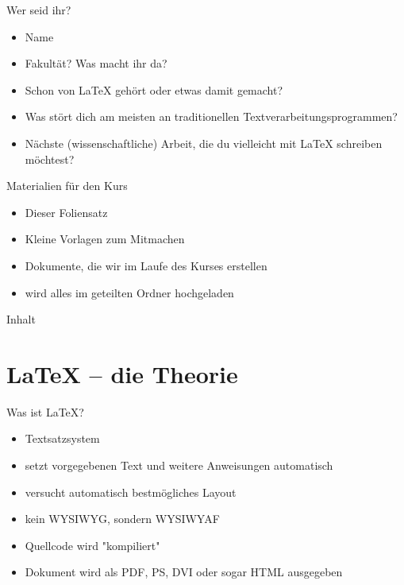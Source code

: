 \documentclass[presentation,aspectratio=169]{beamer}
\begin{document}

\begin{frame}{Wer seid ihr?}
  \begin{itemize}
    \item Name
    \item Fakultät? Was macht ihr da?
    \item Schon von \LaTeX{} gehört oder etwas damit gemacht?
    \item Was stört dich am meisten an traditionellen Textverarbeitungsprogrammen?
    \item Nächste (wissenschaftliche) Arbeit, die du vielleicht mit \LaTeX{} schreiben möchtest?
  \end{itemize}
\end{frame}

\begin{frame}{Materialien für den Kurs}
  \begin{itemize}
    \item Dieser Foliensatz
    \item Kleine Vorlagen zum Mitmachen
    \item Dokumente, die wir im Laufe des Kurses erstellen
      \bigskip
    \item wird alles im geteilten Ordner hochgeladen
  \end{itemize}
\end{frame}

\begin{frame}{Inhalt}
  \tableofcontents
\end{frame}

\section{\LaTeX{} -- die Theorie}

\begin{frame}{Was ist \LaTeX?}
  \begin{itemize}
    \item Textsatzsystem
    \item setzt vorgegebenen Text und weitere Anweisungen automatisch
    \item versucht automatisch bestmögliches Layout
    \item kein WYSIWYG, sondern WYSIWYAF
    \item Quellcode wird "kompiliert"
    \item Dokument wird als PDF, PS, DVI oder sogar HTML ausgegeben
  \end{itemize}
\end{frame}
\end{document}
